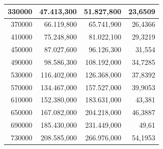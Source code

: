 \documentclass[a4paper, 12pt]{article}
\begin{document}
\begin{longtable}[c]{@{}rrrr@{}}
		\multicolumn{1}{|r|}{330000}                  & \multicolumn{1}{r|}{47.413,300}             & \multicolumn{1}{r|}{51.827,800}             & \multicolumn{1}{r|}{23,6509}                \\* \midrule
		\multicolumn{1}{|r|}{370000}                  & \multicolumn{1}{r|}{66.119,800}             & \multicolumn{1}{r|}{65.741,900}             & \multicolumn{1}{r|}{26,4366}                \\* \midrule
		\multicolumn{1}{|r|}{410000}                  & \multicolumn{1}{r|}{75.248,800}             & \multicolumn{1}{r|}{81.022,100}             & \multicolumn{1}{r|}{29,3219}                \\* \midrule
		\multicolumn{1}{|r|}{450000}                  & \multicolumn{1}{r|}{87.027,600}             & \multicolumn{1}{r|}{96.126,300}             & \multicolumn{1}{r|}{31,554}                 \\* \midrule
		\multicolumn{1}{|r|}{490000}                  & \multicolumn{1}{r|}{98.586,300}             & \multicolumn{1}{r|}{108.192,000}            & \multicolumn{1}{r|}{34,7285}                \\* \midrule
		\multicolumn{1}{|r|}{530000}                  & \multicolumn{1}{r|}{116.402,000}            & \multicolumn{1}{r|}{126.368,000}            & \multicolumn{1}{r|}{37,8392}                \\* \midrule
		\multicolumn{1}{|r|}{570000}                  & \multicolumn{1}{r|}{134.467,000}            & \multicolumn{1}{r|}{157.527,000}            & \multicolumn{1}{r|}{39,9053}                \\* \midrule
		\multicolumn{1}{|r|}{610000}                  & \multicolumn{1}{r|}{152.380,000}            & \multicolumn{1}{r|}{183.631,000}            & \multicolumn{1}{r|}{43,381}                 \\* \midrule
		\multicolumn{1}{|r|}{650000}                  & \multicolumn{1}{r|}{167.082,000}            & \multicolumn{1}{r|}{204.218,000}            & \multicolumn{1}{r|}{46,3887}                \\* \midrule
		\multicolumn{1}{|r|}{690000}                  & \multicolumn{1}{r|}{185.430,000}            & \multicolumn{1}{r|}{231.449,000}            & \multicolumn{1}{r|}{49,61}                  \\* \midrule
		\multicolumn{1}{|r|}{730000}                  & \multicolumn{1}{r|}{208.585,000}            & \multicolumn{1}{r|}{266.976,000}            & \multicolumn{1}{r|}{54,1953}                \\* \midrule

\end{longtable}
\end{document}
